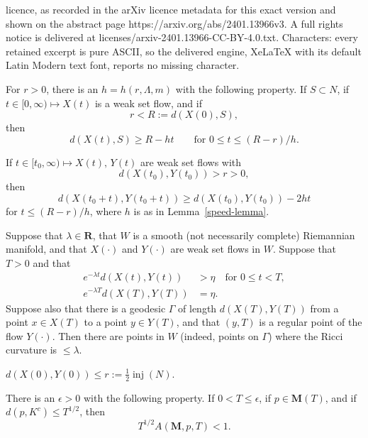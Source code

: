 \documentclass[10pt,a4paper]{amsart}
\newcommand{\MMM}{\mathbf M}
\newcommand{\RR}{\mathbf{R}}  %
\newcommand{\eps}{\epsilon}
\newcommand{\inj}{\operatorname{inj}}    %
\begin{document}
licence, as recorded in the arXiv licence metadata for this exact version and shown on the abstract page https://arxiv.org/abs/2401.13966v3. A full rights notice is delivered at licenses/arxiv-2401.13966-CC-BY-4.0.txt. Characters: every retained excerpt is pure ASCII, so the delivered engine, XeLaTeX with its default Latin Modern text font, reports no missing character.
\begin{lemma}\label{speed-lemma}
For $r>0$, there is an $h=h(r,\Lambda,m)$ with the following property.
If $S\subset N$, if $t\in [0,\infty)\mapsto X(t)$ is a weak set flow, and if
\[
    r < R:=d(X(0),S),
\]
then
\[
    d(X(t),S) \ge R - ht  \qquad\text{for $0\le t \le (R-r)/h$}.
\]
\end{lemma}

\begin{corollary}\label{double-speed-corollary}
If $t\in [t_0,\infty)\mapsto X(t), \, Y(t)$ are weak set flows with
\[
   d(X(t_0),Y(t_0))  > r > 0,
\]
then
\[
    d(X(t_0+t),Y(t_0+t)) \ge d(X(t_0), Y(t_0))  - 2 h t
\]
for $t\le (R-r)/h$, where $h$ is as in Lemma~\ref{speed-lemma}.
\end{corollary}

\begin{proposition}\label{key-fact}
Suppose that $\lambda\in \RR$,  
 that $W$ is a smooth (not necessarily complete)
Riemannian manifold, and 
    that $X(\cdot)$ and $Y(\cdot)$ are weak set flows in $W$. 
  Suppose that $T>0$ and that
\begin{align*}
   e^{-\lambda t} d(X(t),Y(t)) &> \eta \quad\text{for $0\le t<T$}, \\
   e^{-\lambda T} d(X(T),Y(T)) &= \eta.
\end{align*}
Suppose also that there is a geodesic $\Gamma$ of length $d(X(T),Y(T))$
from a point $x\in X(T)$ to a point $y\in Y(T)$, 
and that $(y,T)$ is a regular point of the flow $Y(\cdot)$.
Then there are points in $W$  (indeed, points on $\Gamma$) where the Ricci curvature is $\le \lambda$.
\end{proposition}

\begin{case}\label{case-1} $d(X(0),Y(0)) \le  r:= \frac12 \inj(N)$.
\end{case}

\begin{claim}\label{claim-one}
There is an $\eps>0$ with the following property.
If $0<T\le \eps$, if $p\in \MMM(T)$, and if $d(p,K^c)\le T^{1/2}$, then
\[
  T^{1/2}   A(\MMM,p,T) < 1.
\]
\end{claim}
\end{document}
